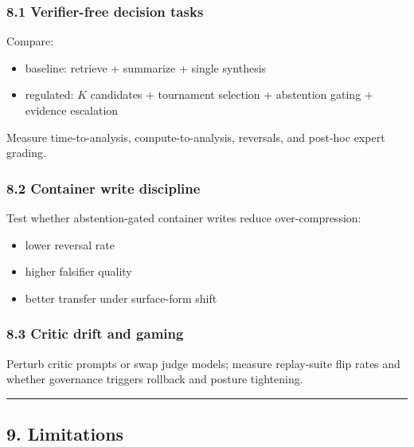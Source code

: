 \documentclass[11pt]{article}
\providecommand{\tightlist}{%
  \setlength{\itemsep}{0pt}\setlength{\parskip}{0pt}}
\begin{document}
\hypertarget{experiment-1}{%
\subsubsection{8.1 Verifier-free decision tasks}\label{experiment-1}}

Compare:

\begin{itemize}
\tightlist
\item baseline: retrieve + summarize + single synthesis
\item regulated: $K$ candidates + tournament selection + abstention gating + evidence escalation
\end{itemize}

Measure time-to-analysis, compute-to-analysis, reversals, and post-hoc expert grading.

\hypertarget{experiment-2}{%
\subsubsection{8.2 Container write discipline}\label{experiment-2}}

Test whether abstention-gated container writes reduce over-compression:

\begin{itemize}
\tightlist
\item lower reversal rate
\item higher falsifier quality
\item better transfer under surface-form shift
\end{itemize}

\hypertarget{experiment-3}{%
\subsubsection{8.3 Critic drift and gaming}\label{experiment-3}}

Perturb critic prompts or swap judge models; measure replay-suite flip rates and whether governance triggers rollback and posture tightening.

\begin{center}\rule{0.5\linewidth}{0.5pt}\end{center}

\hypertarget{limitations}{%
\subsection{9. Limitations}\label{limitations}}
\end{document}
